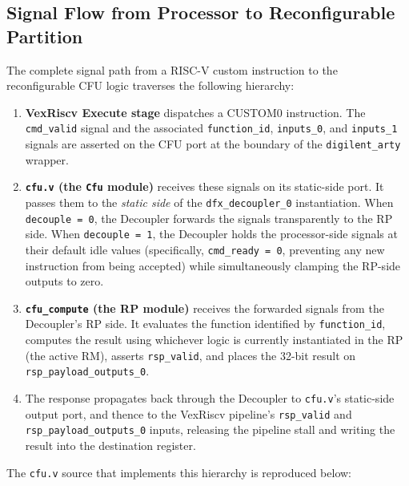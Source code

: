 \subsection{Signal Flow from Processor to Reconfigurable Partition}

The complete signal path from a RISC-V custom instruction to the reconfigurable CFU logic traverses the following hierarchy:

\begin{enumerate}
  \item \textbf{VexRiscv Execute stage} dispatches a CUSTOM0 instruction. The \texttt{cmd\_valid} signal and the associated \texttt{function\_id}, \texttt{inputs\_0}, and \texttt{inputs\_1} signals are asserted on the CFU port at the boundary of the \texttt{digilent\_arty} wrapper.
  \item \textbf{\texttt{cfu.v} (the \texttt{Cfu} module)} receives these signals on its static-side port. It passes them to the \textit{static side} of the \texttt{dfx\_decoupler\_0} instantiation. When \texttt{decouple = 0}, the Decoupler forwards the signals transparently to the RP side. When \texttt{decouple = 1}, the Decoupler holds the processor-side signals at their default idle values (specifically, \texttt{cmd\_ready = 0}, preventing any new instruction from being accepted) while simultaneously clamping the RP-side outputs to zero.
  \item \textbf{\texttt{cfu\_compute} (the RP module)} receives the forwarded signals from the Decoupler's RP side. It evaluates the function identified by \texttt{function\_id}, computes the result using whichever logic is currently instantiated in the RP (the active RM), asserts \texttt{rsp\_valid}, and places the 32-bit result on \texttt{rsp\_payload\_outputs\_0}.
  \item The response propagates back through the Decoupler to \texttt{cfu.v}'s static-side output port, and thence to the VexRiscv pipeline's \texttt{rsp\_valid} and \texttt{rsp\_payload\_outputs\_0} inputs, releasing the pipeline stall and writing the result into the destination register.
\end{enumerate}
The \texttt{cfu.v} source that implements this hierarchy is reproduced below:

